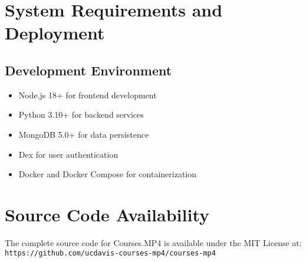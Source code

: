 \documentclass[manuscript,nonacm]{acmart}
\begin{document}




\appendix

\section{System Requirements and Deployment}

\subsection{Development Environment}
\begin{itemize}
    \item Node.js 18+ for frontend development
    \item Python 3.10+ for backend services
    \item MongoDB 5.0+ for data persistence
    \item Dex for user authentication
    \item Docker and Docker Compose for containerization
\end{itemize}

\section{Source Code Availability}
The complete source code for Courses.MP4 is available under the MIT License at:
\newline
\texttt{https://github.com/ucdavis-courses-mp4/courses-mp4}
\end{document}
